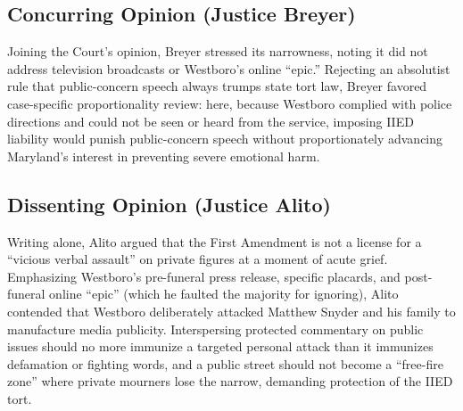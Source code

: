 \documentclass[12pt]{article}
\begin{document}
\subsection{Concurring Opinion (Justice Breyer)}

Joining the Court's opinion, Breyer stressed its narrowness, noting it did not address television broadcasts or Westboro's online ``epic.'' Rejecting an absolutist rule that public-concern speech always trumps state tort law, Breyer favored case-specific proportionality review: here, because Westboro complied with police directions and could not be seen or heard from the service, imposing IIED liability would punish public-concern speech without proportionately advancing Maryland's interest in preventing severe emotional harm.

\subsection{Dissenting Opinion (Justice Alito)}

Writing alone, Alito argued that the First Amendment is not a license for a ``vicious verbal assault'' on private figures at a moment of acute grief. Emphasizing Westboro's pre-funeral press release, specific placards, and post-funeral online ``epic'' (which he faulted the majority for ignoring), Alito contended that Westboro deliberately attacked Matthew Snyder and his family to manufacture media publicity. Interspersing protected commentary on public issues should no more immunize a targeted personal attack than it immunizes defamation or fighting words, and a public street should not become a ``free-fire zone'' where private mourners lose the narrow, demanding protection of the IIED tort.
\end{document}
